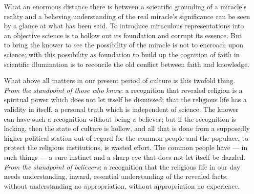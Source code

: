 \documentclass[12pt,a4paper,openany]{book}
\newcommand{\opage}[1]{\marginnote{\footnotesize\textit{[#1]}}}
\begin{document}
What an enormous distance there is between a scientific grounding of a miracle's reality and a
believing understanding of the real miracle's significance can be seen by a glance at what has been
said. To introduce miraculous representations into an objective science is to hollow out its foundation
and corrupt its essence. But to bring the knower to see the possibility of the miracle
\setcounter{footnote}{0}%
\opage{80}is not to encroach upon science; with this possibility as foundation to build up the cognition
of faith in scientific illumination is to reconcile the old conflict between faith and knowledge.

What above all matters in our present period of culture is this twofold thing. \emph{From the
standpoint of those who know}: a recognition that revealed religion is a spiritual power which does not
let itself be dismissed; that the religious life has a validity in itself, a personal truth which is
independent of science. The knower can have such a recognition without being a believer; but if the
recognition is lacking, then the state of culture is hollow, and all that is done from a supposedly
higher political station out of regard for the common people and the populace, to protect the
religious institutions, is wasted effort. The common people have --- in such things --- a sure instinct
and a sharp eye that does not let itself be dazzled. \emph{From the standpoint of believers}: a
recognition that the religious life in our day needs understanding, inward, essential understanding of
the revealed facts: without understanding no appropriation, without appropriation no experience.
\end{document}
